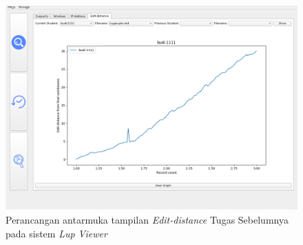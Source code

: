 \begin{figure}[tph]
  \centering
  \includegraphics[width=.9\linewidth]{img/ui/ss-lupv-ed-view}
  \caption{Perancangan antarmuka tampilan \emph{Edit-distance} Tugas Sebelumnya
    pada sistem \emph{Lup Viewer}}\label{fig:ss-lupv-ed-view}
\end{figure}


